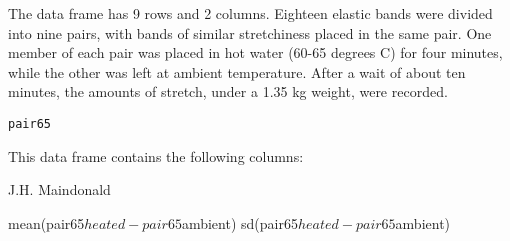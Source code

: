 \begin{Description}\relax
The  data frame has 9 rows and 2 columns.
Eighteen elastic bands were divided into nine pairs, with bands
of similar stretchiness placed in the same pair. One member of
each pair was placed in hot water (60-65 degrees C) for four
minutes, while the other was left at ambient temperature.  After
a wait of about ten minutes, the amounts of stretch, under a 1.35 kg
weight, were recorded.
\end{Description}
\begin{Usage}
\begin{verbatim}pair65\end{verbatim}
\end{Usage}
\begin{Format}\relax
This data frame contains the following columns:
\end{Format}
\begin{Source}\relax
J.H. Maindonald
\end{Source}
\begin{Examples}
\begin{ExampleCode}
mean(pair65$heated - pair65$ambient)
sd(pair65$heated - pair65$ambient)
\end{ExampleCode}
\end{Examples}

